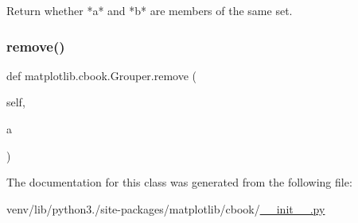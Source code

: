 \begin{DoxyVerb}Return whether *a* and *b* are members of the same set.\end{DoxyVerb}
 \mbox{\label{classmatplotlib_1_1cbook_1_1Grouper_a4901edd86efb4044eb7c56ab785caa9a}} 
\subsubsection{\texorpdfstring{remove()}{remove()}}
{\footnotesize\ttfamily def matplotlib.\+cbook.\+Grouper.\+remove (\begin{DoxyParamCaption}\item[{}]{self,  }\item[{}]{a }\end{DoxyParamCaption})}



The documentation for this class was generated from the following file\+:\begin{DoxyCompactItemize}
\item 
venv/lib/python3./site-\/packages/matplotlib/cbook/\hyperlink{venv_2lib_2python3_89_2site-packages_2matplotlib_2cbook_2____init_____8py}{\+\_\+\+\_\+init\+\_\+\+\_\+.\+py}\end{DoxyCompactItemize}
